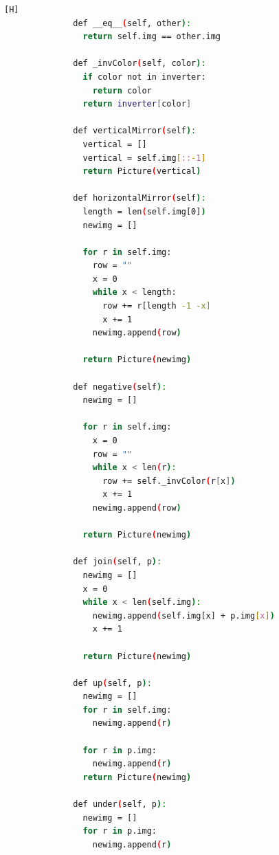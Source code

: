 \documentclass{article}
\begin{document}
        \begin{lstlisting}[language=bash,caption={Métodos de la clase Picture para manipulación de imágenes}][H]
              def __eq__(self, other):
                return self.img == other.img
            
              def _invColor(self, color):
                if color not in inverter:
                  return color
                return inverter[color]
            
              def verticalMirror(self):
                vertical = []
                vertical = self.img[::-1]
                return Picture(vertical)
            
              def horizontalMirror(self):
                length = len(self.img[0])
                newimg = []
            
                for r in self.img:
                  row = ""
                  x = 0
                  while x < length:
                    row += r[length -1 -x]
                    x += 1
                  newimg.append(row)
            
                return Picture(newimg)
            
              def negative(self):
                newimg = []
            
                for r in self.img:
                  x = 0
                  row = ""
                  while x < len(r):
                    row += self._invColor(r[x])
                    x += 1
                  newimg.append(row)
            
                return Picture(newimg)
            
              def join(self, p):
                newimg = []
                x = 0
                while x < len(self.img):
                  newimg.append(self.img[x] + p.img[x])
                  x += 1
            
                return Picture(newimg)
            
              def up(self, p):
                newimg = []
                for r in self.img:
                  newimg.append(r)
            
                for r in p.img:
                  newimg.append(r)
                return Picture(newimg)
            
              def under(self, p):
                newimg = []
                for r in p.img:
                  newimg.append(r)
            

\end{lstlisting}
\end{document}
